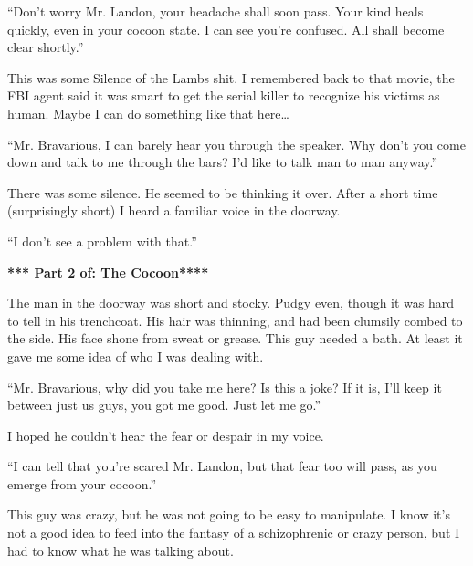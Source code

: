 ``Don't worry Mr. Landon, your headache shall soon pass.
Your kind heals quickly, even in your cocoon state. I can see
you're confused. All shall become clear shortly.''



This was some Silence of the Lambs shit. I remembered back to that
movie, the FBI agent said it was smart to get the serial killer to
recognize his victims as human. Maybe I can do something like that
here{\ldots}



``Mr. Bravarious, I can barely hear you through the speaker.
Why don't you come down and talk to me through the bars?
I'd like to talk man to man anyway.''



There was some silence. He seemed to be thinking it over. After a
short time (surprisingly short) I heard a familiar voice in the
doorway.



``I don't see a problem with that.'' 

 





{\bf **** Part 2 of: The Cocoon****}



The man in the doorway was short and stocky. Pudgy even, though it
was hard to tell in his trenchcoat. His hair was thinning, and had
been clumsily combed to the side. His face shone from sweat or
grease. This guy needed a bath. At least it gave me some idea of
who I was dealing with.



``Mr. Bravarious, why did you take me here? Is this a joke? If
it is, I'll keep it between just us guys, you got me good.
Just let me go.''



I hoped he couldn't hear the fear or despair in my
voice.



``I can tell that you're scared Mr. Landon, but that
fear too will pass, as you emerge from your cocoon.''



This guy was crazy, but he was not going to be easy to manipulate.
I know it's not a good idea to feed into the fantasy of a
schizophrenic or crazy person, but I had to know what he was
talking about.



